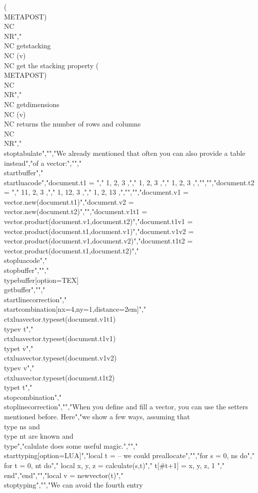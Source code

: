 (\\METAPOST) \\NC \\NR","\\NC getstacking   \\NC (v)       \\NC get the stacking property (\\METAPOST) \\NC \\NR","\\NC getdimensions \\NC (v)       \\NC returns the number of rows and columns \\NC \\NR","\\stoptabulate","","We already mentioned that often you can also provide a table instead","of a vector:","","\\startbuffer","\\startluacode","document.t1 = {","    { 1, 2, 3 },","    { 1, 2, 3 },","    { 1, 2, 3 },","}","","document.t2 = {","    { 11, 2, 3 },","    { 1, 12, 3 },","    { 1, 2, 13 },","}","","document.v1 = vector.new(document.t1)","document.v2 = vector.new(document.t2)","","document.v1t1 = vector.product(document.v1,document.t2)","document.t1v1 = vector.product(document.t1,document.v1)","document.v1v2 = vector.product(document.v1,document.v2)","document.t1t2 = vector.product(document.t1,document.t2)","\\stopluacode","\\stopbuffer","","\\typebuffer[option=TEX] \\getbuffer","","\\startlinecorrection","\\startcombination[nx=4,ny=1,distance=2em]","    {\\ctxlua{vector.typeset(document.v1t1)}} {\\type{v t}}","    {\\ctxlua{vector.typeset(document.t1v1)}} {\\type{t v}}","    {\\ctxlua{vector.typeset(document.v1v2)}} {\\type{v v}}","    {\\ctxlua{vector.typeset(document.t1t2)}} {\\type{t t}}","\\stopcombination","\\stoplinecorrection","","When you define and fill a vector, you can use the setters mentioned before. Here","we show a few ways, assuming that \\type {ns} and \\type {nt} are known and \\type","{calulate} does some useful magic.","","\\starttyping[option=LUA]","local t = { }  -- we could preallocate","","for s = 0, ns do","    for t = 0, nt do","        local x, y, z = calculate(s,t)","        t[#t+1] = { x, y, z, 1 }","   end","end","","local v = newvector(t)","\\stoptyping","","We can avoid the fourth entry 